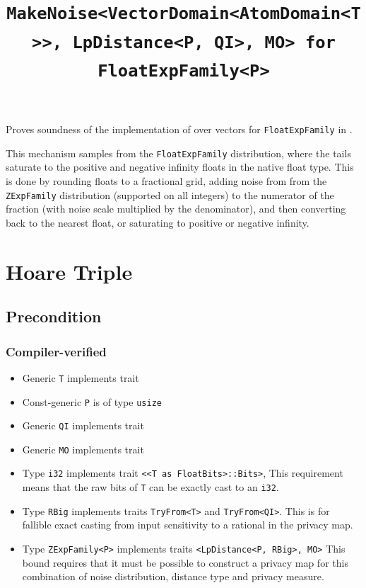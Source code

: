 \documentclass{article}
\title{\texttt{MakeNoise<VectorDomain<AtomDomain<T>>, LpDistance<P, QI>, MO> for FloatExpFamily<P>}}
\author{\MichaelShoemateAuthor}
\date{}
\begin{document}
\maketitle

\contrib
Proves soundness of the implementation of  over vectors
for \texttt{FloatExpFamily} in .

This mechanism samples from the \texttt{FloatExpFamily} distribution,
where the tails saturate to the positive and negative infinity floats in the native float type.
This is done by rounding floats to a fractional grid,
adding noise from from the \texttt{ZExpFamily} distribution (supported on all integers)
to the numerator of the fraction (with noise scale multiplied by the denominator),
and then converting back to the nearest float, or saturating to positive or negative infinity.

\section{Hoare Triple}
\subsection*{Precondition}
\subsubsection*{Compiler-verified}

\begin{itemize}
    \item Generic \texttt{T} implements trait 
    \item Const-generic \texttt{P} is of type \texttt{usize}
    \item Generic \texttt{QI} implements trait 
    \item Generic \texttt{MO} implements trait 
    \item Type \texttt{i32} implements trait \texttt{<<T as FloatBits>::Bits>},
        This requirement means that the raw bits of \texttt{T} can be exactly cast to an \texttt{i32}.
    \item Type \texttt{RBig} implements traits \texttt{TryFrom<T>} and \texttt{TryFrom<QI>}.
        This is for fallible exact casting from input sensitivity to a rational in the privacy map.
    \item Type \texttt{ZExpFamily<P>} implements traits \texttt{<LpDistance<P, RBig>, MO>}
        This bound requires that it must be possible to construct a privacy map for this combination of noise distribution, distance type and privacy measure.
\end{itemize}
\end{document}

